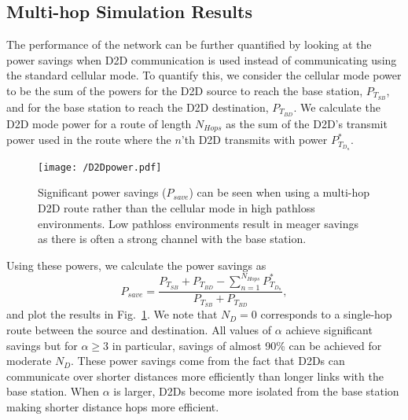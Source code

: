 \documentclass[10pt, final, journal, letterpaper,oneside, twocolumn]{IEEEtran}
\begin{document}
\subsection{Multi-hop Simulation Results}
\label{sec:multihop_simulation}

The performance of the network can be further quantified by looking at the power savings when D2D communication is used instead of communicating using the standard cellular mode.  To quantify this, we consider the cellular mode power to be the sum of the powers for the D2D source to reach the base station, $P_{T_{SB}}$, and for the base station to reach the D2D destination, $P_{T_{BD}}$.  We calculate the D2D mode power for a route of length $N_{Hops}$ as the sum of the D2D's transmit power used in the route where the $n$'th D2D transmits with power $P_{T_{D_n}}^*$.  
\begin{figure}[htp]
\center
  \texttt{[image: /D2Dpower.pdf]}
  \caption[]{Significant power savings ($P_{save}$) can be seen when using a multi-hop D2D route rather than the cellular mode in high pathloss environments.  Low pathloss environments result in meager savings as there is often a strong channel with the base station.} 
  \label{fig:d2dpower}
\end{figure}   
Using these powers, we calculate the power savings as
\begin{equation}
P_{save} = \dfrac{P_{T_{SB}}+P_{T_{BD}}-\sum\limits_{n=1}^{N_{Hops}} P_{T_{D_n}}^*}{P_{T_{SB}}+P_{T_{BD}}},
\end{equation}
and plot the results in Fig.~\ref{fig:d2dpower}.  We note that $N_D=0$ corresponds to a single-hop route between the source and destination.  All values of $\alpha$ achieve significant savings but for $\alpha \geq 3$ in particular, savings of almost 90\% can be achieved for moderate $N_D$.  These power savings come from the fact that D2Ds can communicate over shorter distances more efficiently than longer links with the base station.  When $\alpha$ is larger, D2Ds become more isolated from the base station making shorter distance hops more efficient.  
\end{document}
